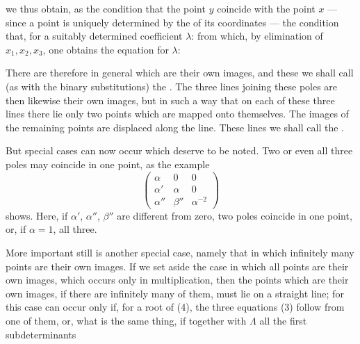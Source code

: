 we thus obtain, as the condition that the point $y$ coincide with the point $x$ — since a point is uniquely determined by the  of its coordinates — the condition that, for a suitably determined coefficient $\lambda$:
from which, by elimination of $x_1, x_2, x_3$, one obtains the  equation for $\lambda$:

There are therefore in general  which are their own images, and these we shall call (as with the binary substitutions) the . The three lines joining these poles are then likewise their own images, but in such a way that on each of these three lines there lie only two points which are mapped onto themselves. The images of the remaining points are displaced along the line. These lines we shall call the .

But special cases can now occur which deserve to be noted. Two or even all three poles may coincide in one point, as the example
\[ \begin{pmatrix} \alpha & 0 & 0 \\ \alpha' & \alpha & 0 \\ \alpha'' & \beta'' & \alpha^{-2} \end{pmatrix} \]
shows. Here, if $\alpha'$, $\alpha''$, $\beta''$ are different from zero, two poles coincide in one point, or, if $\alpha = 1$, all three.

More important still is another special case, namely that in which infinitely many points are their own images. If we set aside the case in which all points are their own images, which occurs only in multiplication, then the points which are their own images, if there are infinitely many of them, must lie on a straight line; for this case can occur only if, for a root of (4), the three equations (3) follow from one of them, or, what is the same thing, if together with $\Lambda$ all the first subdeterminants
